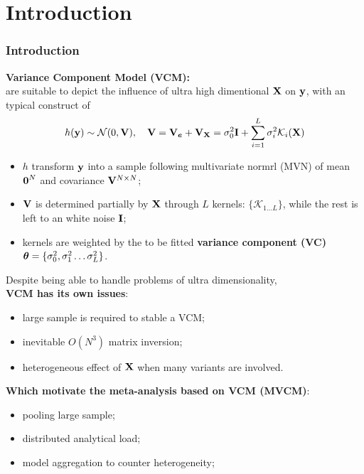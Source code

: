 \documentclass{beamer}
\begin{document}
\section{Introduction}
\begin{frame}
  \frametitle{Introduction} %
  \textbf{Variance Component Model (VCM):} \\
  are suitable to depict the influence of ultra high dimentional $\mathbf{X}$
  on $\mathbf{y}$, with an typical construct of
  \begin{align}\label{eq:vcm}
    h(\mathbf{y}) \sim \mathcal{N}(0, \mathbf{V}), \quad
    \mathbf{V} = \mathbf{V}_{\boldsymbol{e}} + \mathbf{V}_{\mathbf{X}} = \sigma^2_0 \textbf{I} + \sum_{i=1}^L
    \sigma^2_i \mathcal{K}_i(\mathbf{X})
  \end{align}
  \begin{itemize}
  \item $h$ transform $\mathbf{y}$ into a sample following multivariate
    normrl (MVN) of mean $\boldsymbol{0}^N$ and covariance $\mathbf{V}^{N \times N}$;
  \item $\mathbf{V}$ is determined partially by $\mathbf{X}$ through $L$ kernels:
    $\{\mathcal{K}_{1 \dots L}\}$, while the rest is left to an white
    noise $\textbf{I}$;
  \item kernels are weighted by the to be fitted \textbf{variance
      component (VC)}
    $\boldsymbol{\theta} = \{\sigma^2_0, \sigma^2_1 \dots \sigma^2_L\}$.
  \end{itemize}
\end{frame}
\begin{frame}
  Despite being able to handle problems of ultra dimensionality, \\
  \textbf{VCM has its own issues}:
  \begin{itemize}
  \item large sample is required to stable a VCM;
  \item inevitable $O(N^3)$ matrix inversion;
  \item heterogeneous effect of $\mathbf{X}$ when many variants are involved.
  \end{itemize}
  \textbf{Which motivate the meta-analysis based on VCM (MVCM)}:
  \begin{itemize}
  \item pooling large sample;
  \item distributed analytical load;
  \item model aggregation to counter heterogeneity;
  \end{itemize}
\end{frame}
\end{document}
